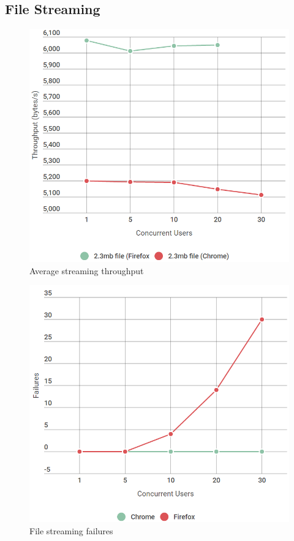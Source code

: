 \documentclass[]{report}
\begin{document}
		\subsection{File Streaming}
		\begin{figure}[H]
			\caption{Average streaming throughput}
			\centering
			\includegraphics[scale=0.45]{streaming-chart.png}
		\end{figure}
		\begin{figure}[H]
			\caption{File streaming failures}
			\centering
			\includegraphics[scale=0.45]{stream-failures-chart.png}
		\end{figure}
		
\end{document}
